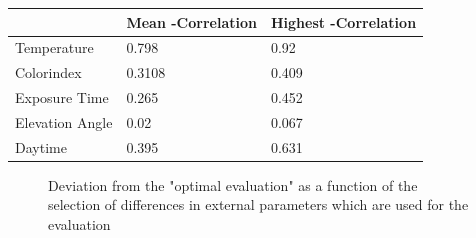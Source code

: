 \documentclass  [
  paper    = a4,
  BCOR     = 10mm,
  twoside,
  fontsize = 12pt,
  fleqn,
  toc      = bibnumbered,
  toc      = listofnumbered,
  numbers  = noendperiod,
  headings = normal,
  listof   = leveldown,
  version  = 3.03
]                                       {scrreprt}
\begin{document}
	\begin{table}[h]
		\begin{tabular}{|p{4cm}|p{3cm}|p{3cm}|}
			&  Mean -Correlation&  Highest   -Correlation\\
			\toprule
			Temperature &0.798&	0.92\\
			\midrule
			Colorindex &0.3108&	0.409\\
			\midrule
			Exposure Time &0.265&	0.452\\
			\midrule
			Elevation Angle &0.02&	0.067\\
			\midrule
			Daytime &0.395&	0.631\\
			\bottomrule
		\end{tabular}
	\label{tab:CorrEP}
	\end{table}
	\begin{figure}
		\caption{Deviation from the "optimal evaluation" as a function of the selection of differences in external parameters which are used for the evaluation}
		\label{fig:WelcheEP}
	\end{figure}
\end{document}
